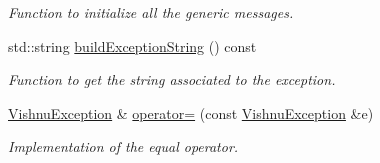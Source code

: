 \begin{DoxyCompactItemize}
\begin{DoxyCompactList}\small\item\em Function to initialize all the generic messages. \item\end{DoxyCompactList}\item 
std::string \hyperlink{classVishnuException_a22a9ad3e0f438accd20442a7a6ffcb58}{buildExceptionString} () const 
\begin{DoxyCompactList}\small\item\em Function to get the string associated to the exception. \item\end{DoxyCompactList}\item 
\hyperlink{classVishnuException}{VishnuException} \& \hyperlink{classVishnuException_a329095015a92f306599007ae27d836c1}{operator=} (const \hyperlink{classVishnuException}{VishnuException} \&e)
\begin{DoxyCompactList}\small\item\em Implementation of the equal operator. \item\end{DoxyCompactList}\end{DoxyCompactItemize}
